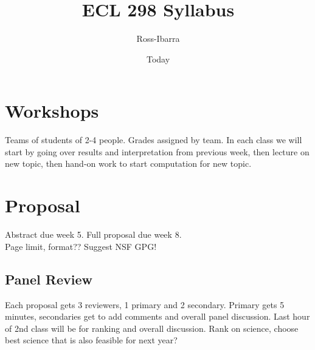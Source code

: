 \documentclass[]{article}
\begin{document}
\title{ECL 298 Syllabus}
\author{Ross-Ibarra}
\date{Today}
\maketitle

\section*{Workshops}

Teams of students of 2-4 people. Grades assigned by team. In each class we will start by going over results and interpretation from previous week, then lecture on new topic, then hand-on work to start computation for new topic.

\section*{Proposal}
Abstract due week 5. Full proposal due week 8. \\
Page limit, format??  Suggest NSF GPG!

\subsection*{Panel Review}
Each proposal gets 3 reviewers, 1 primary and 2 secondary. Primary gets 5 minutes, secondaries get to add comments and overall panel discussion. Last hour of 2nd class will be for ranking and overall discussion. Rank on science, choose best science that is also feasible for next year?
\end{document}
